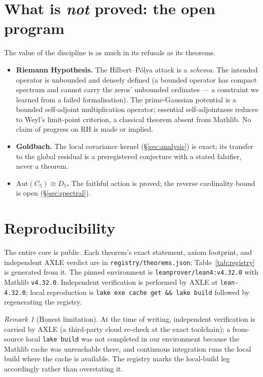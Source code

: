 \documentclass[11pt]{article}
\theoremstyle{definition}
\theoremstyle{remark}
\newtheorem{remark}[theorem]{Remark}
\newcommand{\lean}[1]{\texttt{#1}}
\begin{document}
\section{What is \emph{not} proved: the open program}\label{sec:open}

The value of the discipline is as much in its refusals as its theorems.
\begin{itemize}[leftmargin=*,itemsep=2pt]
  \item \textbf{Riemann Hypothesis.} The Hilbert--P\'olya attack is a \emph{schema}. The
  intended operator is unbounded and densely defined (a bounded operator has compact spectrum
  and cannot carry the zeros' unbounded ordinates --- a constraint we learned from a failed
  formalisation). The prime-Gaussian potential is a bounded self-adjoint multiplication
  operator; essential self-adjointness reduces to Weyl's limit-point criterion, a classical
  theorem absent from Mathlib. No claim of progress on RH is made or implied.
  \item \textbf{Goldbach.} The local covariance kernel (\S\ref{sec:analysis}) is exact; its
  transfer to the global residual is a preregistered conjecture with a stated falsifier, never
  a theorem.
  \item \textbf{$\mathrm{Aut}(C_5)\cong D_5$.} The faithful action is proved; the reverse
  cardinality bound is open (\S\ref{sec:spectral}).
\end{itemize}

\section{Reproducibility}\label{sec:repro}

The entire core is public. Each theorem's exact statement, axiom footprint, and independent
AXLE verdict are in \lean{registry/theorems.json}; Table~\ref{tab:registry} is generated from
it. The pinned environment is \lean{leanprover/lean4:v4.32.0} with Mathlib \lean{v4.32.0}.
Independent verification is performed by AXLE at \lean{lean-4.32.0}; local reproduction is
\lean{lake exe cache get \&\& lake build} followed by regenerating the registry.

\begin{remark}[Honest limitation]
At the time of writing, independent verification is carried by AXLE (a third-party cloud
re-check at the exact toolchain); a from-source local \lean{lake build} was not completed in our
environment because the Mathlib cache was unreachable there, and continuous integration runs the
local build where the cache is available. The registry marks the local-build leg accordingly
rather than overstating it.
\end{remark}
\end{document}
